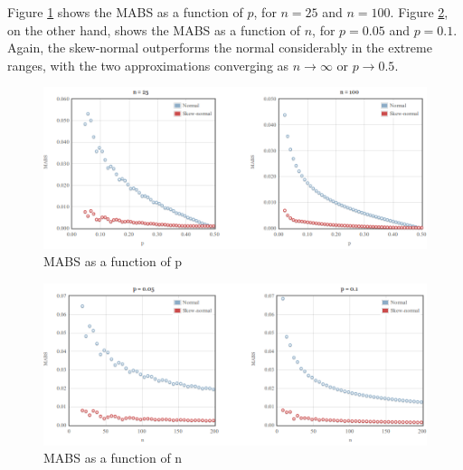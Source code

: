 \documentclass{article}
\begin{document}
Figure \ref{fig:mabs-fixed-n} shows the MABS as a function of $p$, for $n=25$
and $n=100$. Figure \ref{fig:mabs-fixed-p}, on the other hand, shows the MABS
as a function of $n$, for $p=0.05$ and $p=0.1$. Again, the skew-normal
outperforms the normal considerably in the extreme ranges, with the two
approximations converging as $n \rightarrow \infty$ or $p \rightarrow 0.5$.

\begin{figure}[h]
  \centering
  \includegraphics[width=\textwidth]{../graphs/images/mabs-fixed-n.png}
  \caption{MABS as a function of p}
  \label{fig:mabs-fixed-n}
\end{figure}

\begin{figure}[h]
  \centering
  \includegraphics[width=\textwidth]{../graphs/images/mabs-fixed-p.png}
  \caption{MABS as a function of n}
  \label{fig:mabs-fixed-p}
\end{figure}

\nocite{*}



\end{document}
